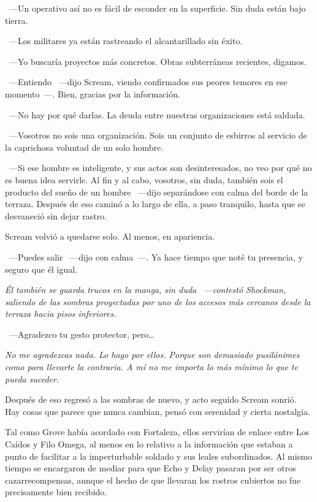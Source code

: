 ~---Un operativo así no es fácil de esconder en la superficie. Sin duda están bajo tierra.

~---Los militares ya están rastreando el alcantarillado sin éxito.

~---Yo buscaría proyectos más concretos. Obras subterráneas recientes, digamos.

~---Entiendo ~---dijo Scream, viendo confirmados sus peores temores en ese momento~---. Bien, gracias por la información.

~---No hay por qué darlas. La deuda entre nuestras organizaciones está saldada.

~---Vosotros no sois una organización. Sois un conjunto de esbirros al servicio de la caprichosa voluntad de un solo hombre.

~---Si ese hombre es inteligente, y sus actos son desinteresados, no veo por qué no es buena idea servirle. Al fin y al cabo, vosotros, sin duda, también sois el producto del sueño de un hombre ~---dijo separándose con calma del borde de la terraza. Después de eso caminó a lo largo de ella, a paso tranquilo, hasta que se desvaneció sin dejar rastro.

Scream volvió a quedarse solo. Al menos, en apariencia.

~---Puedes salir ~---dijo con calma~---. Ya hace tiempo que noté tu presencia, y seguro que él igual.

\emph{Él también se guarda trucos en la manga, sin duda ~---contestó Shockman, saliendo de las sombras proyectadas por uno de los accesos más cercanos desde la terraza hacia pisos inferiores.}

~---Agradezco tu gesto protector, pero\dots

\emph{No me agradezcas nada. Lo hago por ellos. Porque son demasiado pusilánimes como para llevarte la contraria. A mí no me importa lo más mínimo lo que te pueda suceder.}

Después de eso regresó a las sombras de nuevo, y acto seguido Scream sonrió. Hay cosas que parece que nunca cambian, pensó con serenidad y cierta nostalgia.

\parbreak
Tal como Grove había acordado con Fortaleza, ellos servirían de enlace entre Los Caídos y Filo Omega, al menos en lo relativo a la información que estaban a punto de facilitar a la imperturbable soldado y sus leales subordinados. Al mismo tiempo se encargaron de mediar para que Echo y Delay pasaran por ser otros cazarrecompensas, aunque el hecho de que llevaran los rostros cubiertos no fue precisamente bien recibido.

